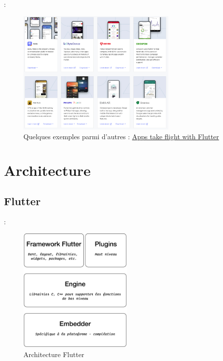 \documentclass[10pt]{beamer}
\begin{document}
\begin{frame}[fragile,t]{\secname : \subsecname}
    \begin{figure}[H]
        \begin{center}
            \includegraphics[width=0.7\textwidth]{../assets/img/exemples2.jpg}
            \caption*{Quelques exemples parmi d'autres : \href{https://flutter.dev/showcase}{Apps take flight with Flutter}}
        \end{center}
    \end{figure}
\end{frame}

\section{Architecture}

\subsection{Flutter}
\begin{frame}[fragile,t]{\secname : \subsecname}
    \begin{figure}[H]
        \begin{center}
            \includegraphics[width=0.5\textwidth]{../assets/img/architecture-flutter.eps}
            \caption*{Architecture Flutter}
            \label{Fig:architecture-flutter}
        \end{center}
    \end{figure}
\end{frame}
\end{document}
